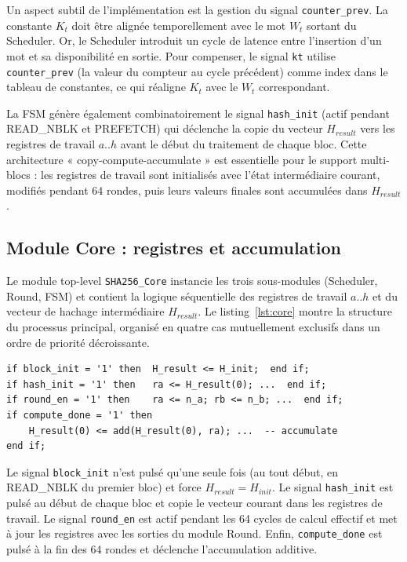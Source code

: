 Un aspect subtil de l'implémentation est la gestion du signal \texttt{counter\_prev}. La constante $K_t$ doit être alignée temporellement avec le mot $W_t$ sortant du Scheduler. Or, le Scheduler introduit un cycle de latence entre l'insertion d'un mot et sa disponibilité en sortie. Pour compenser, le signal \texttt{kt} utilise \texttt{counter\_prev} (la valeur du compteur au cycle précédent) comme index dans le tableau de constantes, ce qui réaligne $K_t$ avec le $W_t$ correspondant.

La FSM génère également combinatoirement le signal \texttt{hash\_init} (actif pendant READ\_NBLK et PREFETCH) qui déclenche la copie du vecteur $H_{result}$ vers les registres de travail $a..h$ avant le début du traitement de chaque bloc. Cette architecture « copy-compute-accumulate » est essentielle pour le support multi-blocs : les registres de travail sont initialisés avec l'état intermédiaire courant, modifiés pendant 64 rondes, puis leurs valeurs finales sont accumulées dans $H_{result}$.

\subsection{Module Core : registres et accumulation}

Le module top-level \texttt{SHA256\_Core} instancie les trois sous-modules (Scheduler, Round, FSM) et contient la logique séquentielle des registres de travail $a..h$ et du vecteur de hachage intermédiaire $H_{result}$. Le listing~\ref{lst:core} montre la structure du processus principal, organisé en quatre cas mutuellement exclusifs dans un ordre de priorité décroissante.

\begin{lstlisting}[caption={SHA256\_Core -- registres de travail et accumulation},label={lst:core}]
if block_init = '1' then  H_result <= H_init;  end if;
if hash_init = '1' then   ra <= H_result(0); ...  end if;
if round_en = '1' then    ra <= n_a; rb <= n_b; ...  end if;
if compute_done = '1' then
    H_result(0) <= add(H_result(0), ra); ...  -- accumulate
end if;
\end{lstlisting}

Le signal \texttt{block\_init} n'est pulsé qu'une seule fois (au tout début, en READ\_NBLK du premier bloc) et force $H_{result} = H_{init}$. Le signal \texttt{hash\_init} est pulsé au début de chaque bloc et copie le vecteur courant dans les registres de travail. Le signal \texttt{round\_en} est actif pendant les 64 cycles de calcul effectif et met à jour les registres avec les sorties du module Round. Enfin, \texttt{compute\_done} est pulsé à la fin des 64 rondes et déclenche l'accumulation additive.

